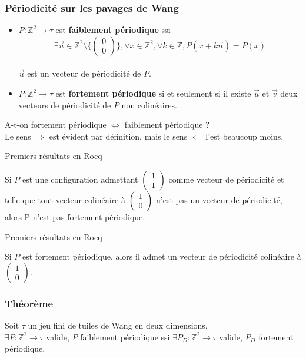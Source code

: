 \documentclass{beamer}
\newcommand{\Z}{\mathbb{Z}}
\begin{document}
\begin{frame}
\frametitle{Périodicité sur les pavages de Wang}
    \begin{itemize}
        \item  $P : \Z^2 \rightarrow \tau$ est \textbf{faiblement périodique} ssi $$\exists \Vec{u}  \in \Z^2 \setminus \{\begin{pmatrix} 0 \\ 0 \end{pmatrix}\} , \forall x \in \Z^2, \forall k \in \Z, P(x+k\Vec{u}) = P(x)$$\\
        $\Vec{u}$ est un vecteur de périodicité de $P$.
        \item $P : \Z^2 \rightarrow \tau$ est \textbf{fortement périodique} si et seulement si il existe $\Vec{u}$ et $\Vec{v}$ deux vecteurs de périodicité de $P$ non colinéaires.
    \end{itemize}

\pause

A-t-on fortement périodique $\Leftrightarrow$ faiblement périodique ?\\
Le sens $\Rightarrow$ est évident par définition, mais le sens $\Leftarrow$ l'est beaucoup moins.
\end{frame}

\begin{frame}{Premiers résultats en Rocq}

\begin{thm}{}{}
Si $P$ est une configuration admettant $\begin{pmatrix} 1 \\ 1 \end{pmatrix}$ comme vecteur de périodicité
et telle que tout vecteur colinéaire à $\begin{pmatrix} 1 \\ 0 \end{pmatrix}$ n'est pas un vecteur de
périodicité, alors P n'est pas fortement périodique.
\end{thm}
\end{frame}

\begin{frame}{Premiers résultats en Rocq}
    


\begin{thm}{}{}
Si $P$ est fortement périodique, alors il admet un vecteur de périodicité colinéaire à $\begin{pmatrix} 1 \\ 0 \end{pmatrix}$.
\end{thm}

\end{frame}


\begin{frame}

    \frametitle{Théorème}
    
\begin{thm}{}{}
Soit $\tau$ un jeu fini de tuiles de Wang en deux dimensions.\\
$\exists P : \Z^2 \rightarrow \tau$ valide, $P$ faiblement périodique ssi $\exists P_D : \Z^2 \rightarrow \tau$ valide, $P_D$ fortement périodique. \\ 
\end{thm}
\end{frame}
\end{document}
